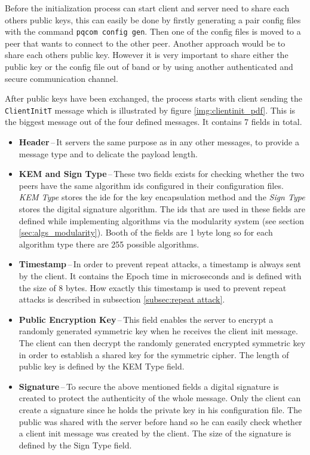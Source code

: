 Before the initialization process can start client and server need to share each others public keys, this can easily be done by firstly generating a pair config files with the command \texttt{pqcom config gen}. Then one of the config files is moved to a peer that wants to connect to the other peer. Another approach would be to share each others public key. However it is very important to share either the public key or the config file out of band or by using another authenticated and secure communication channel.

After public keys have been exchanged, the process starts with client sending the \texttt{ClientInitT} message which is illustrated by figure \ref{img:clientinit_pdf}. This is the biggest message out of the four defined messages. It contains 7 fields in total.
\begin{itemize}
  \item \textbf{Header}\,--\,It servers the same purpose as in any other messages, to provide a message type and to delicate the payload length.
  \item \textbf{KEM and Sign Type}\,--\,These two fields exists for checking whether the two peers have the same algorithm ids configured in their configuration files. \textit{KEM Type} stores the ide for the key encapsulation method and the \textit{Sign Type} stores the digital signature algorithm. The ids that are used in these fields are defined while implementing algorithms via the modularity system (see section \ref{sec:algs_modularity}). Booth of the fields are 1 byte long so for each algorithm type there are 255 possible algorithms.
  \item \textbf{Timestamp}\,--\,In order to prevent repeat attacks, a timestamp is always sent by the client. It contains the Epoch time in microseconds and is defined with the size of 8 bytes. How exactly this timestamp is used to prevent repeat attacks is described in subsection \ref{subsec:repeat attack}.
  \item \textbf{Public Encryption Key}\,--\,This field enables the server to encrypt a randomly generated symmetric key when he receives the client init message. The client can then decrypt the randomly generated encrypted symmetric key in order to establish a shared key for the symmetric cipher. The length of public key is defined by the KEM Type field.
  \item \textbf{Signature}\,--\,To secure the above mentioned fields a digital signature is created to protect the authenticity of the whole message. Only the client can create a signature since he holds the private key in his configuration file. The public was shared with the server before hand so he can easily check whether a client init message was created by the client. The size of the signature is defined by the Sign Type field.
\end{itemize}

